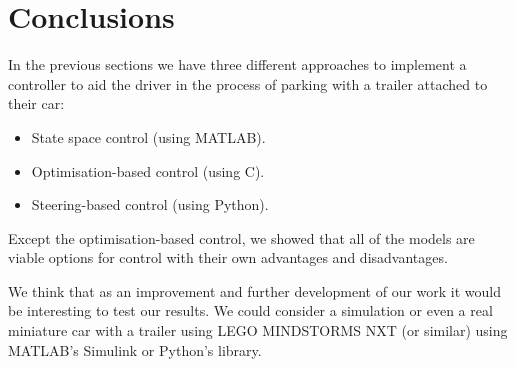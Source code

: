 \section{Conclusions}

In the previous sections we have three different approaches to implement a controller to aid the driver in the process of parking with a trailer attached to their car:
\begin{itemize}
    \item State space control (using MATLAB).
    \item Optimisation-based control (using C).
    \item Steering-based control (using Python).
\end{itemize}

Except the optimisation-based control, we showed that all of the models are viable options for control with their own advantages and disadvantages.

\bigskip
We think that as an improvement and further development of our work it would be interesting to test our results. We could consider a simulation or even a real miniature car with a trailer using LEGO MINDSTORMS NXT (or similar) using MATLAB's Simulink or Python's  library.
